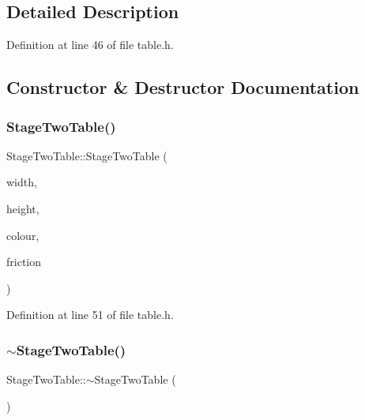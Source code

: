 \subsection{Detailed Description}


Definition at line 46 of file table.\+h.



\subsection{Constructor \& Destructor Documentation}
\mbox{\label{class_stage_two_table_abfe56f335f3eda0c72ae8477fe65e71f}} 
\subsubsection{\texorpdfstring{Stage\+Two\+Table()}{StageTwoTable()}}
{\footnotesize\ttfamily Stage\+Two\+Table\+::\+Stage\+Two\+Table (\begin{DoxyParamCaption}\item[{int}]{width,  }\item[{int}]{height,  }\item[{Q\+Color}]{colour,  }\item[{double}]{friction }\end{DoxyParamCaption})\hspace{0.3cm}{\ttfamily [inline]}}



Definition at line 51 of file table.\+h.

\mbox{\label{class_stage_two_table_a91ebe178acea5030255266e54adfa7a9}} 
\subsubsection{\texorpdfstring{$\sim$\+Stage\+Two\+Table()}{~StageTwoTable()}}
{\footnotesize\ttfamily Stage\+Two\+Table\+::$\sim$\+Stage\+Two\+Table (\begin{DoxyParamCaption}{ }\end{DoxyParamCaption})}



